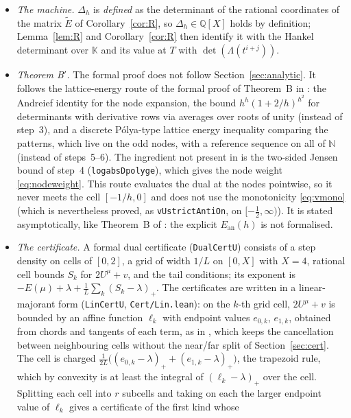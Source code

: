 \documentclass[11pt]{amsart}
\theoremstyle{definition}
\theoremstyle{remark}
\numberwithin{equation}{section}
\newcommand{\NN}{\mathbb{N}}
\newcommand{\QQ}{\mathbb{Q}}
\newcommand{\KK}{\mathbb{K}}
\newcommand{\lean}[1]{{\def\_{\textunderscore\allowbreak}\texttt{#1}}}
\begin{document}
\begin{itemize}
\item \emph{The machine.} $\Delta_h$ is \emph{defined} as the determinant of the rational coordinates of the matrix
  $\tilde E$ of Corollary~\ref{cor:R}, so $\Delta_h\in\QQ[X]$ holds by definition; Lemma~\ref{lem:R} and
  Corollary~\ref{cor:R} then identify it with the Hankel determinant over $\KK$ and its value at $T$ with
  $\det(\Lambda(t^{i+j}))$.
\item \emph{Theorem B$'$.} The formal proof does not follow Section~\ref{sec:analytic}. It follows the lattice-energy
  route of the formal proof of Theorem~B in \cite{Chi2Paper}: the Andreief identity for the node expansion, the bound
  $h^h(1+2/h)^{h^2}$ for determinants with derivative rows via averages over roots of unity (instead of step~3), and a
  discrete P\'olya-type lattice energy inequality comparing the patterns, which live on the odd nodes, with a reference
  sequence on all of $\NN$ (instead of steps~5--6). The ingredient not present in \cite{Chi2Repo} is the two-sided Jensen
  bound of step~4
  (\lean{log\_abs\_Dpoly\_ge}), which gives the node weight \eqref{eq:nodeweight}. This route evaluates the dual at the
  nodes pointwise, so it never meets the cell $[-1/h,0]$ and does not use the monotonicity \eqref{eq:vmono} (which is
  nevertheless proved, as \lean{vU\_strictAntiOn}, on $[-\frac12,\infty)$). It is stated asymptotically, like Theorem~B of
  \cite{Chi2Paper}: the explicit $E_{\mathrm{an}}(h)$ is not formalised.
\item \emph{The certificate.} A formal dual certificate (\lean{DualCertU}) consists of a step density on cells of
  $[0,2]$, a grid of width $1/L$ on $[0,X]$ with $X=4$, rational cell bounds $S_k$ for $2U^\mu+v$, and the tail
  conditions; its exponent is $-E(\mu)+\lambda+\frac1L\sum_k(S_k-\lambda)_+$. The certificates are written in a
  linear-majorant form (\lean{LinCertU}, \lean{Cert\slash{}Lin.lean}): on the $k$-th grid cell, $2U^\mu+v$ is bounded by
  an affine function $\ell_k$ with endpoint values $e_{0,k}$, $e_{1,k}$, obtained from chords and tangents of each term,
  as in \cite{Chi2Paper}, which keeps the cancellation between neighbouring cells without the near/far split of
  Section~\ref{sec:cert}. The cell is charged $\frac1{2L}\bigl((e_{0,k}-\lambda)_++(e_{1,k}-\lambda)_+\bigr)$, the
  trapezoid rule, which by convexity is at least the integral of $(\ell_k-\lambda)_+$ over the cell. Splitting each cell
  into $r$ subcells and taking on each the larger endpoint value of $\ell_k$ gives a certificate of the first kind whose

\end{itemize}
\end{document}
